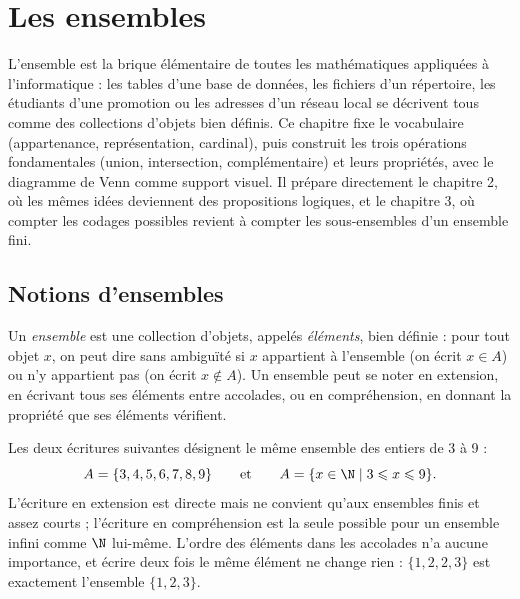 \chapter{Les ensembles}

\begin{quelqueslignes}
L'ensemble est la brique élémentaire de toutes les mathématiques appliquées à l'informatique : les tables d'une base de données, les fichiers d'un répertoire, les étudiants d'une promotion ou les adresses d'un réseau local se décrivent tous comme des collections d'objets bien définis. Ce chapitre fixe le vocabulaire (appartenance, représentation, cardinal), puis construit les trois opérations fondamentales (union, intersection, complémentaire) et leurs propriétés, avec le diagramme de Venn comme support visuel. Il prépare directement le chapitre 2, où les mêmes idées deviennent des propositions logiques, et le chapitre 3, où compter les codages possibles revient à compter les sous-ensembles d'un ensemble fini.
\end{quelqueslignes}

\section{Notions d'ensembles}

\begin{definition}
Un \emph{ensemble} est une collection d'objets, appelés \emph{éléments}, bien définie : pour tout objet $x$, on peut dire sans ambiguïté si $x$ appartient à l'ensemble (on écrit $x \in A$) ou n'y appartient pas (on écrit $x \notin A$). Un ensemble peut se noter en extension, en écrivant tous ses éléments entre accolades, ou en compréhension, en donnant la propriété que ses éléments vérifient.
\end{definition}

Les deux écritures suivantes désignent le même ensemble des entiers de 3 à 9 :
\[
A = \{3, 4, 5, 6, 7, 8, 9\} \qquad\text{et}\qquad A = \{x \in \N \mid 3 \leqslant x \leqslant 9\}.
\]
L'écriture en extension est directe mais ne convient qu'aux ensembles finis et assez courts ; l'écriture en compréhension est la seule possible pour un ensemble infini comme $\N$ lui-même. L'ordre des éléments dans les accolades n'a aucune importance, et écrire deux fois le même élément ne change rien : $\{1, 2, 2, 3\}$ est exactement l'ensemble $\{1, 2, 3\}$.

